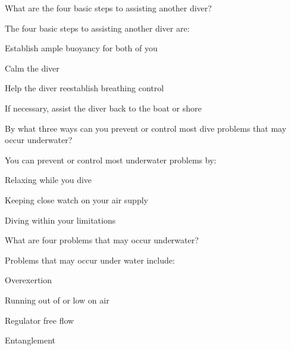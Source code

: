 	\begin{qanda}
		\begin{question}
What are the four basic steps to assisting another diver?
		\end{question}

		\begin{answer}
The four basic steps to assisting another diver are:
			\begin{nospacenumberedlist}
				\item Establish ample buoyancy for both of you
				\item Calm the diver
				\item Help the diver reestablish breathing control
				\item If necessary, assist the diver back to the boat or shore
			\end{nospacenumberedlist}
		\end{answer}
	\end{qanda}

	\begin{qanda}
		\begin{question}
By what three ways can you prevent or control most dive problems that may occur underwater?
		\end{question}

		\begin{answer}
You can prevent or control most underwater problems by:
			\begin{nospacenumberedlist}
				\item Relaxing while you dive
				\item Keeping close watch on your air supply
				\item Diving within your limitations
			\end{nospacenumberedlist}
		\end{answer}
	\end{qanda}

	\begin{qanda}
		\begin{question}
What are four problems that may occur underwater?
		\end{question}

		\begin{answer}
Problems that may occur under water include:
			\begin{nospacenumberedlist}
				\item Overexertion
				\item Running out of or low on air
				\item Regulator free flow
				\item Entanglement
			\end{nospacenumberedlist}
		\end{answer}
	\end{qanda}


